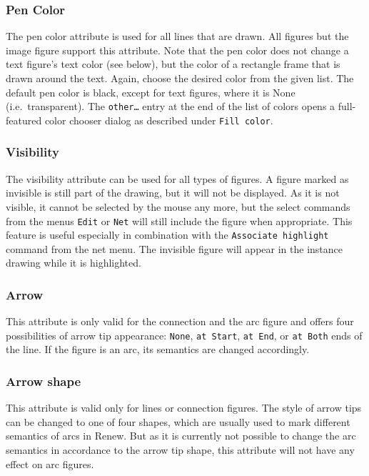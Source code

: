 
\subsubsection{Pen Color}

The pen color attribute is used for all lines that are drawn.
All figures but the image figure support this attribute.
Note that the pen color does not change a text figure's
text color (see below), but the color of a rectangle frame
that is drawn around the text.
Again, choose the desired color from the given list.
The default pen color is black, except for text figures, where
it is None (i.e.\ transparent).
The \texttt{other\dots} entry at the end of the list of colors opens a
full-featured color chooser dialog as described under \texttt{Fill color}.

\subsubsection{Visibility}

The visibility attribute can be used for all types of figures.
A figure marked as invisible is still part of the drawing, but
it will not be displayed. As it is not visible, it cannot be
selected by the mouse any more, but the select commands from
the menus \texttt{Edit} or \texttt{Net} will still include the
figure when appropriate.
This feature is useful especially in combination with the
\texttt{Associate highlight} command from the net menu. The
invisible figure will appear in the instance drawing while it
is highlighted.

\subsubsection{Arrow}

This attribute is only valid for the connection and the
arc figure and offers four possibilities of arrow tip
appearance: \texttt{None}, \texttt{at Start}, \texttt{at End},
or \texttt{at Both} ends of the line.
If the figure is an arc, its semantics are changed accordingly.

\subsubsection{Arrow shape}
This attribute is valid only for lines or connection figures.
The style of arrow tips can be changed to one of four shapes,
which are usually used to mark different semantics of arcs in
Renew.
But as it is currently not possible to change the arc semantics
in accordance to the arrow tip shape, this attribute will not
have any effect on arc figures.

